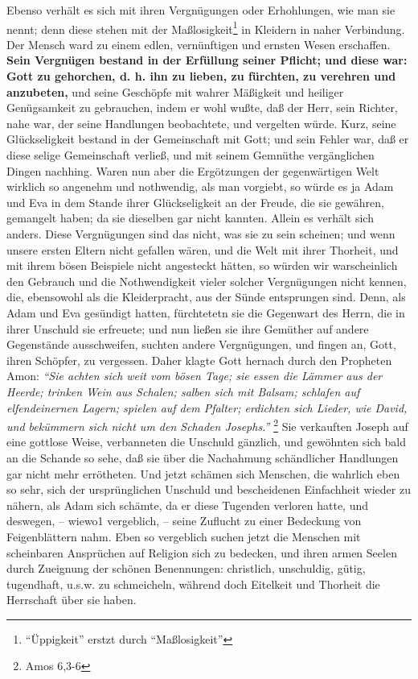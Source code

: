 Ebenso verhält es sich mit ihren Vergnügungen oder Erhohlungen, wie man sie
nennt; denn diese stehen mit der Maßlosigkeit\footnote{"`Üppigkeit"' erstzt durch "`Maßlosigkeit"'} in Kleidern in naher Verbindung. Der
Mensch ward zu einem edlen, vernünftigen und ernsten Wesen erschaffen. \textbf{Sein
Vergnügen bestand in der Erfüllung seiner Pflicht; und diese war: Gott zu
gehorchen, d. h. ihn zu lieben, zu fürchten, zu verehren und anzubeten,} und
seine Geschöpfe mit wahrer Mäßigkeit und heiliger Genügsamkeit zu gebrauchen,
indem er wohl wußte, daß der Herr, sein Richter, nahe war, der seine Handlungen
beobachtete, und vergelten würde. Kurz, seine Glückseligkeit bestand in der
Gemeinschaft mit Gott; und sein Fehler war, daß er diese selige Gemeinschaft
verließ, und mit seinem Gemnüthe vergänglichen Dingen nachhing. Waren nun aber
die Ergötzungen der gegenwärtigen Welt wirklich so angenehm und nothwendig, als
man vorgiebt, so würde es ja Adam und Eva in dem Stande ihrer Glückseligkeit an
der Freude, die sie gewähren, gemangelt haben; da sie dieselben gar nicht
kannten. Allein es verhält sich anders. Diese Vergnügungen sind das nicht, was
sie zu sein scheinen; und wenn unsere ersten Eltern nicht gefallen wären, und
die Welt mit ihrer Thorheit, und mit ihrem bösen Beispiele nicht angesteckt
hätten, so würden wir warscheinlich den Gebrauch und die Nothwendigkeit vieler
solcher Vergnügungen nicht kennen, die, ebensowohl als die Kleiderpracht, aus
der Sünde entsprungen sind. Denn, als Adam und Eva gesündigt hatten, fürchtetetn
sie die Gegenwart des Herrn, die in ihrer Unschuld sie erfreuete; und nun ließen
sie ihre Gemüther auf andere Gegenstände ausschweifen, suchten andere
Vergnügungen, und fingen an, Gott, ihren Schöpfer, zu vergessen. Daher klagte
Gott hernach durch den Propheten Amon:
\textit{"`Sie achten sich weit vom bösen Tage;
sie essen die Lämmer aus der Heerde; trinken Wein aus Schalen; salben sich mit
Balsam; schlafen auf elfendeinernen Lagern; spielen auf dem Pfalter; erdichten
sich Lieder, wie David, und bekümmern sich nicht um den Schaden
Josephs."'}
\footnote{Amos 6,3-6}
Sie verkauften Joseph auf eine gottlose
Weise, verbanneten die Unschuld gänzlich, und gewöhnten sich bald an die Schande
so sehe, daß sie über die Nachahmung schändlicher Handlungen gar nicht mehr
errötheten. Und jetzt schämen sich Menschen, die wahrlich eben so sehr, sich der
ursprünglichen Unschuld und bescheidenen Einfachheit wieder zu nähern, als Adam
sich schämte, da er diese Tugenden verloren hatte, und deswegen, -- wiewo1
vergeblich, -- seine Zuflucht zu einer Bedeckung von Feigenblättern nahm. Eben
so vergeblich suchen jetzt die Menschen mit scheinbaren Ansprüchen auf Religion
sich zu bedecken, und ihren armen Seelen durch Zueignung der schönen
Benennungen: christlich, unschuldig, gütig, tugendhaft, u.s.w. zu schmeicheln,
während doch Eitelkeit und Thorheit die Herrschaft über sie haben.

